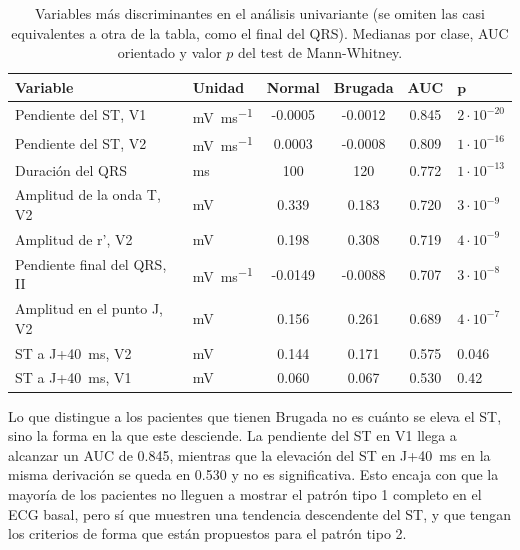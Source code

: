 \begin{table}[H]
\centering
\caption[Variables más discriminantes]{Variables más discriminantes en el análisis univariante (se omiten las casi equivalentes a otra de la tabla, como el final del QRS). Medianas por clase, AUC orientado y valor $p$ del test de Mann-Whitney.}
\label{tab:univariante}
\small
\begin{tabular}{@{}llS[table-format=-3.4]S[table-format=-3.4]S[table-format=1.3]l@{}}
\toprule
\textbf{Variable} & \textbf{Unidad} & {\textbf{Normal}} & {\textbf{Brugada}} & {\textbf{AUC}} & $\boldsymbol{p}$ \\
\midrule
Pendiente del ST, V1 & \si{\milli\volt\per\milli\second} & -0.0005 & -0.0012 & 0.845 & $2 \cdot 10^{-20}$ \\
Pendiente del ST, V2 & \si{\milli\volt\per\milli\second} & 0.0003 & -0.0008 & 0.809 & $1 \cdot 10^{-16}$ \\
Duración del QRS & \si{\milli\second} & 100 & 120 & 0.772 & $1 \cdot 10^{-13}$ \\
Amplitud de la onda T, V2 & \si{\milli\volt} & 0.339 & 0.183 & 0.720 & $3 \cdot 10^{-9}$ \\
Amplitud de r', V2 & \si{\milli\volt} & 0.198 & 0.308 & 0.719 & $4 \cdot 10^{-9}$ \\
Pendiente final del QRS, II & \si{\milli\volt\per\milli\second} & -0.0149 & -0.0088 & 0.707 & $3 \cdot 10^{-8}$ \\
Amplitud en el punto J, V2 & \si{\milli\volt} & 0.156 & 0.261 & 0.689 & $4 \cdot 10^{-7}$ \\
\midrule
ST a J+\SI{40}{\milli\second}, V2 & \si{\milli\volt} & 0.144 & 0.171 & 0.575 & \num{0.046} \\
ST a J+\SI{40}{\milli\second}, V1 & \si{\milli\volt} & 0.060 & 0.067 & 0.530 & \num{0.42} \\
\bottomrule
\end{tabular}
\end{table}


Lo que distingue a los pacientes que tienen Brugada no es cuánto se eleva el ST, sino la forma en la que este desciende. La pendiente del ST en V1 llega a alcanzar un AUC de \num{0.845}, mientras que la elevación del ST en J+\SI{40}{\milli\second} en la misma derivación se queda en \num{0.530} y no es significativa. Esto encaja con que la mayoría de los pacientes no lleguen a mostrar el patrón tipo 1 completo en el ECG basal, pero sí que muestren una tendencia descendente del ST, y que tengan los criterios de forma que están propuestos para el patrón tipo 2.

